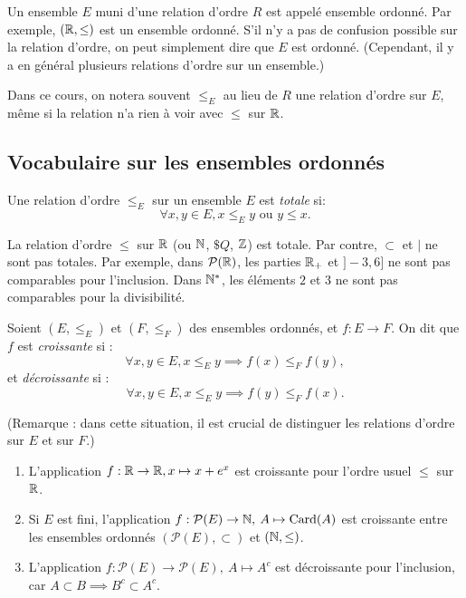 Un ensemble $E$ muni d'une relation d'ordre $R$ est appelé ensemble ordonné. Par exemple, $(\mathbb{R}, \leq)$ est un ensemble ordonné. S'il n'y a pas de confusion possible sur la relation d'ordre, on peut simplement dire que $E$ est ordonné. (Cependant, il y a en général plusieurs relations d'ordre sur un ensemble.)

Dans ce cours, on notera souvent $\leq_E$ au lieu de $R$ une relation d'ordre sur $E$, même si la relation n'a rien à voir avec $\leq$ sur $\mathbb{R}$.


\subsection{Vocabulaire sur les ensembles ordonnés}

\begin{definition}
Une relation d'ordre $\leq_E$ sur un ensemble $E$ est \emph{totale} si:
\[ \forall x, y\in E, x\leq_Ey\text{ ou } y\leq x.\]
\end{definition}

\begin{exemples}
La relation d'ordre $\leq$ sur $\mathbb{R}$ (ou $\mathbb{N}$, $\$Q$, $\mathbb{Z}$) est totale. Par contre, $\subset$ et $|$ ne sont pas totales. Par exemple, dans $\mathcal P(\mathbb{R})$, les parties $\mathbb{R}_+$ et $]-3,6]$ ne sont pas comparables pour l'inclusion. Dans $\mathbb{N}^*$, les éléments $2$ et $3$ ne sont pas comparables pour la divisibilité.
\end{exemples}

\begin{definition}
Soient $(E,\leq_E)$ et $(F,\leq_F)$ des ensembles ordonnés, et $f : E\to F$. On dit que $f$ est \emph{croissante} si :
\[ \forall x, y\in E, x\leq_E y \implies f(x) \leq_F f(y),\]
et \emph{décroissante} si :
\[\forall x, y\in E, x\leq_E y \implies f(y) \leq_F f(x).\]
\end{definition}

(Remarque : dans cette situation, il est crucial de distinguer les relations d'ordre sur $E$ et sur $F$.)

\begin{exemple}
\begin{enumerate}
\item L'application $f : \mathbb{R}\to \mathbb{R}, x\mapsto x+e^x$ est croissante pour l'ordre usuel $\leq $ sur $\mathbb{R}$.
\item Si $E$ est fini, l'application $f : \mathcal P(E) \to \mathbb{N}, \: A\mapsto \operatorname{Card}(A)$ est croissante entre les ensembles ordonnés $(\mathcal P(E), \subset)$ et $(\mathbb{N}, \leq)$.
\item L'application $f : \mathcal P(E) \to \mathcal P(E), \: A\mapsto A^c$ est décroissante pour l'inclusion, car $A\subset B \implies B^c\subset A^c$.
\end{enumerate}
\end{exemple}

